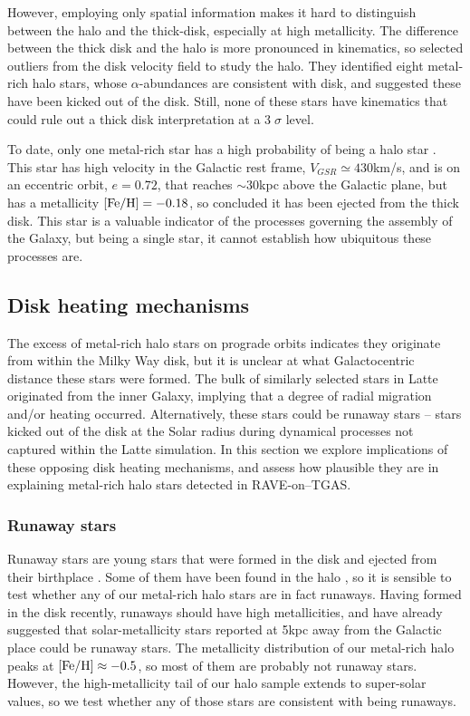 \documentclass[apj, twocolappendix, numberedappendix, appendixfloats]{emulateapj}
\begin{document}
However, employing only spatial information makes it hard to distinguish between the halo and the thick-disk, especially at high metallicity.
The difference between the thick disk and the halo is more pronounced in kinematics, so \citet{sheffield2012} selected outliers from the disk velocity field to study the halo.
They identified eight metal-rich halo stars, whose $\alpha$-abundances are consistent with disk, and suggested these have been kicked out of the disk.
Still, none of these stars have kinematics that could rule out a thick disk interpretation at a $3\;\sigma$ level.

To date, only one metal-rich star has a high probability of being a halo star \citep{hawkins2015}.
This star has high velocity in the Galactic rest frame, $V_{GSR}\simeq430$\;km/s, and is on an eccentric orbit, $e=0.72$, that reaches $\sim30$\;kpc above the Galactic plane, but has a metallicity $\rm[Fe/H]=-0.18$, so \citet{hawkins2015} concluded it has been ejected from the thick disk.
This star is a valuable indicator of the processes governing the assembly of the Galaxy, but being a single star, it cannot establish how ubiquitous these processes are.

\subsection{Disk heating mechanisms}
\label{sec:diskheating}
The excess of metal-rich halo stars on prograde orbits indicates they originate from within the Milky Way disk, but it is unclear at what Galactocentric distance these stars were formed.
The bulk of similarly selected stars in Latte originated from the inner Galaxy, implying that a degree of radial migration and/or heating occurred.
Alternatively, these stars could be runaway stars -- stars kicked out of the disk at the Solar radius during dynamical processes not captured within the Latte simulation.
In this section we explore implications of these opposing disk heating mechanisms, and assess how plausible they are in explaining metal-rich halo stars detected in RAVE-on--TGAS.

\subsubsection{Runaway stars}
\label{sec:runaway}
Runaway stars are young stars that were formed in the disk and ejected from their birthplace \citep{blaauw1961}.
Some of them have been found in the halo \citep[e.g.,][]{conlon1990}, so it is sensible to test whether any of our metal-rich halo stars are in fact runaways.
Having formed in the disk recently, runaways should have high metallicities, and \citet{bromley2009} have already suggested that solar-metallicity stars reported at 5\;kpc away from the Galactic place \citep{ivezic2008} could be runaway stars.
The metallicity distribution of our metal-rich halo peaks at $\rm[Fe/H]\approx-0.5$, so most of them are probably not runaway stars.
However, the high-metallicity tail of our halo sample extends to super-solar values, so we test whether any of those stars are consistent with being runaways.
\end{document}
